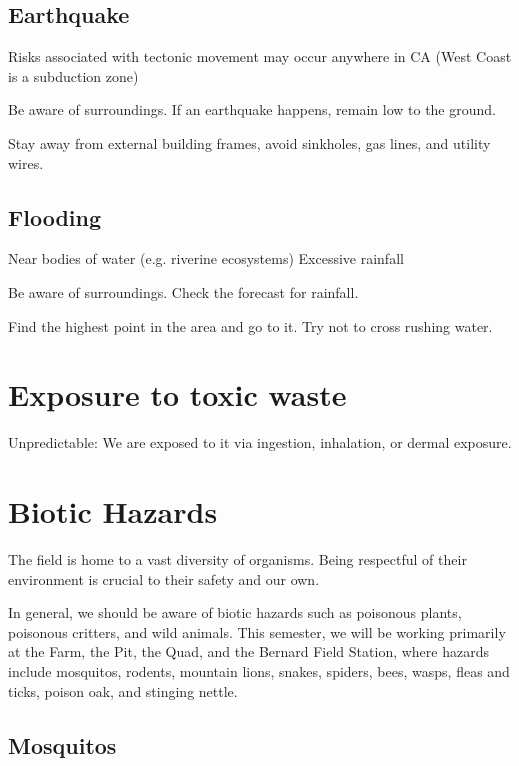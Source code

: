 \documentclass[12pt]{../SOP2}
\begin{document}
\subsection{Earthquake}

\NP Risks associated with tectonic movement may occur anywhere in CA (West Coast is a subduction zone)

\NP Be aware of surroundings. If an earthquake happens, remain low to the ground.

\NP Stay away from external building frames, avoid sinkholes, gas lines, and utility wires.

\subsection{Flooding}

Near bodies of water (e.g. riverine ecosystems)
Excessive rainfall

\NP Be aware of surroundings. Check the forecast for rainfall.

\NP Find the highest point in the area and go to it. Try not to cross rushing water. 



\section{Exposure to toxic waste}


Unpredictable: We are exposed to it via ingestion, inhalation, or dermal exposure.


\section{Biotic Hazards}

\NP The field is home to a vast diversity of organisms. Being respectful of their environment is crucial to their safety and our own.

\NP In general, we should be aware of biotic hazards such as poisonous plants, poisonous critters, and wild animals. This semester, we will be working primarily at the Farm, the Pit, the Quad, and the Bernard Field Station, where hazards include mosquitos, rodents, mountain lions, snakes, spiders, bees, wasps, fleas and ticks, poison oak, and stinging nettle.

\subsection{Mosquitos}
\end{document}
